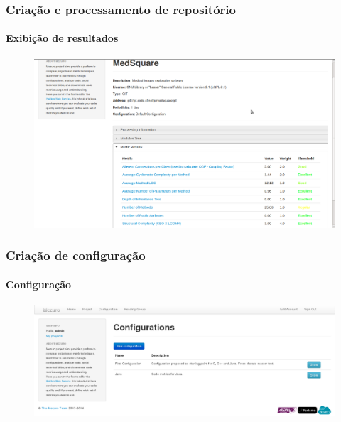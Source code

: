 \documentclass{beamer}
\begin{document}
  \begin{frame}
    \frametitle{Criação e processamento de repositório}
    \framesubtitle{Exibição de resultados}

    \begin{figure}[htb]
      \begin{center}
        \includegraphics[scale=0.24]{images/04-new-repository-results.png}
      \end{center}
    \end{figure}
  \end{frame}

  \begin{frame}
    \frametitle{Criação de configuração}
    \framesubtitle{Configuração}

    \begin{figure}[htb]
      \begin{center}
        \includegraphics[scale=0.24]{images/05-new-configuration.png}
      \end{center}
    \end{figure}
  \end{frame}
\end{document}
